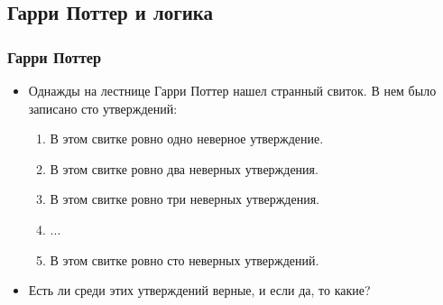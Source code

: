 \documentclass[compress,red]{beamer}
\begin{document}
\subsection{Гарри Поттер и логика}
\begin{frame}[fragile]
  \frametitle{Гарри Поттер}
  \begin{itemize}
    \item Однажды на лестнице Гарри Поттер нашел странный свиток. В нем было записано сто утверждений:
    \begin{enumerate}
      \item В этом свитке ровно одно неверное утверждение.
      \item В этом свитке ровно два неверных утверждения.
      \item В этом свитке ровно три неверных утверждения.
      \item ...
      \item В этом свитке ровно сто неверных утверждений.
    \end{enumerate}
    \item Есть ли среди этих утверждений верные, и если да, то какие?
  \end{itemize}
\end{frame}
\end{document}
